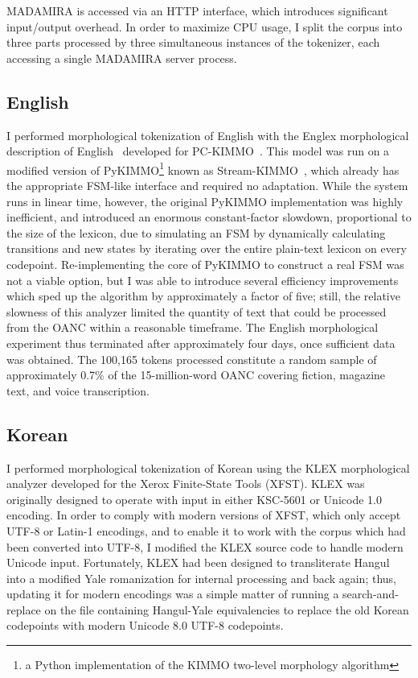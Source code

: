 MADAMIRA is accessed via an HTTP interface, which introduces significant input/output overhead. In order to maximize CPU usage, I split the corpus into three parts processed by three simultaneous instances of the tokenizer, each accessing a single MADAMIRA server process.

\subsection{English}
I performed morphological tokenization of English with the Englex morphological description of English~\cite{antworthenglex} developed for PC-KIMMO~\cite{koskenniemi84}. This model was run on a modified version of PyKIMMO\footnote{a Python implementation of the KIMMO two-level morphology algorithm} known as Stream-KIMMO~\cite{kearsley13}, which already has the appropriate FSM-like interface and required no adaptation. While the system runs in linear time, however, the original PyKIMMO implementation was highly inefficient, and introduced an enormous constant-factor slowdown, proportional to the size of the lexicon, due to simulating an FSM by dynamically calculating transitions and new states by iterating over the entire plain-text lexicon on every codepoint. Re-implementing the core of PyKIMMO to construct a real FSM was not a viable option, but I was able to introduce several efficiency improvements which sped up the algorithm by approximately a factor of five; still, the relative slowness of this analyzer limited the quantity of text that could be processed from the OANC within a reasonable timeframe. The English morphological experiment thus terminated after approximately four days, once sufficient data was obtained. The 100,165 tokens processed constitute a random sample of approximately 0.7\% of the 15-million-word OANC covering fiction, magazine text, and voice transcription.

\subsection{Korean}
I performed morphological tokenization of Korean using the KLEX morphological analyzer developed for the Xerox Finite-State Tools (XFST). KLEX was originally designed to operate with input in either KSC-5601 or Unicode 1.0 encoding. In order to comply with modern versions of XFST, which only accept UTF-8 or Latin-1 encodings, and to enable it to work with the corpus which had been converted into UTF-8, I modified the KLEX source code to handle modern Unicode input. Fortunately, KLEX had been designed to transliterate Hangul into a modified Yale romanization for internal processing and back again; thus, updating it for modern encodings was a simple matter of running a search-and-replace on the file containing Hangul-Yale equivalencies to replace the old Korean codepoints with modern Unicode 8.0 UTF-8 codepoints.

